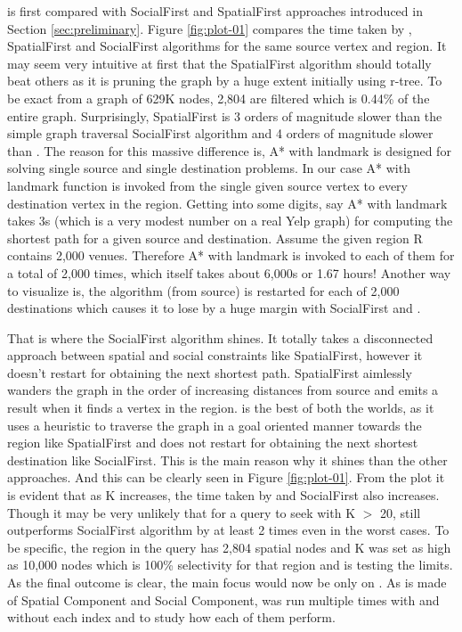 {\rrp} is first compared with SocialFirst and SpatialFirst approaches introduced in Section \ref{sec:preliminary}. Figure \ref{fig:plot-01} compares the time taken by {\rrp}, SpatialFirst and SocialFirst algorithms for the same source vertex and region. It may seem very intuitive at first that the SpatialFirst algorithm should totally beat others as it is pruning the graph by a huge extent initially using r-tree. To be exact from a graph of 629K nodes, 2,804 are filtered which is 0.44\% of the entire graph. Surprisingly, SpatialFirst is 3 orders of magnitude slower than the simple graph traversal SocialFirst algorithm and 4 orders of magnitude slower than {\rrp}. The reason for this massive difference is, A* with landmark is designed for solving single source and single destination problems. In our case A* with landmark function is invoked from the single given source vertex to every destination vertex in the region. Getting into some digits, say A* with landmark takes 3s (which is a very modest number on a real Yelp graph) for computing the shortest path for a given source and destination. Assume the given region R contains 2,000 venues. Therefore A* with landmark is invoked to each of them for a total of 2,000 times, which itself takes about 6,000s or 1.67 hours! Another way to visualize is, the algorithm (from source) is restarted for each of 2,000 destinations which causes it to lose by a huge margin with SocialFirst and {\rrp}.

That is where the SocialFirst algorithm shines. It totally takes a disconnected approach between spatial and social constraints like SpatialFirst, however it doesn't restart for obtaining the next shortest path. SpatialFirst aimlessly wanders the graph in the order of increasing distances from source and emits a result when it finds a vertex in the region. {\rrp} is the best of both the worlds, as it uses a heuristic to traverse the graph in a goal oriented manner towards the region like SpatialFirst and does not restart for obtaining the next shortest destination like SocialFirst. This is the main reason why it shines than the other approaches. And this can be clearly seen in Figure \ref{fig:plot-01}. From the plot it is evident that as K increases, the time taken  by {\rrp} and SocialFirst also increases. Though it may be very unlikely that for a query to seek with K $>$ 20, {\rrp} still outperforms SocialFirst algorithm by at least 2 times even in the worst cases. To be specific, the region in the query has 2,804 spatial nodes and K was set as high as 10,000 nodes which is 100\% selectivity for that region and is testing the limits. As the final outcome is clear, the main focus would now be only on {\rrp}. As {\rrp} is made of Spatial Component and Social Component, {\rrp} was run multiple times with and without each index and to study how each of them perform.

